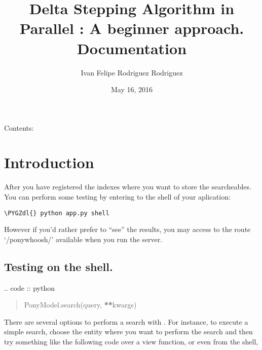\documentclass[letterpaper,10pt,english]{sphinxmanual}
\title{Delta Stepping Algorithm in Parallel : A beginner approach. Documentation}
\date{May 16, 2016}
\author{Ivan Felipe Rodriguez Rodriguez}
\def\PYGZdl{\char`\$}
\begin{document}
\maketitle
\tableofcontents
{}\label{index::doc}


Contents:


\chapter{Introduction}
\label{Introduction:introduction}\label{Introduction:welcome-to-delta-stepping-algorithm-in-parallel-a-beginner-approach-s-documentation}\label{Introduction::doc}\label{Introduction:id1}
After you have registered the indexes where you want to store the searcheables. You can perform some testing by entering to the shell of your aplication:

\begin{Verbatim}[commandchars=\\\{\}]
\PYGZdl{} python app.py shell
\end{Verbatim}

However if you'd rather  prefer to ``see'' the results, you may access to the route `/ponywhoosh/' available when you run the server.


\section{Testing on the shell.}
\label{Introduction:testing-on-the-shell}
\href{https://pypi.python.org/pypi/Flask-PonyWhoosh}{}
.. code :: python
\begin{quote}

PonyModel.search(query, {\color{red}\bfseries{}**}kwargs)
\end{quote}

There are several options to perform a search with . For instance, to execute a  simple search, choose the entity where you want to perform the search and then  try
something like the following code over a view function, or even from the shell,
\end{document}
